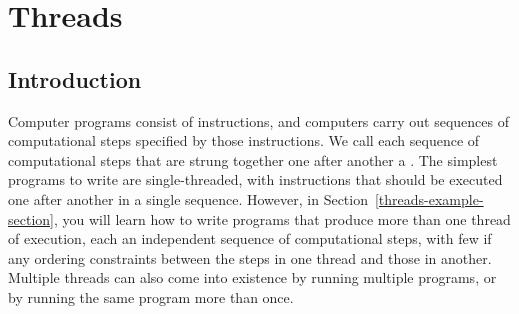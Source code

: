 \chapter{Threads}
\label{threads-chapter}

\section{Introduction}
Computer programs consist of instructions, and computers carry out
sequences of computational steps specified by those instructions.  We
call each sequence of computational steps that are strung together one after
another a .  The simplest programs to write are
single-threaded, with instructions that should be executed one after
another in a single sequence.  However, in
Section~\ref{threads-example-section}, you will learn how to write
programs that produce more than one thread of execution, each an
independent sequence of computational steps, with few if any
ordering constraints between the steps in one thread and those in
another.  Multiple threads can also come into existence by running
multiple programs, or by running the same program more than once.

